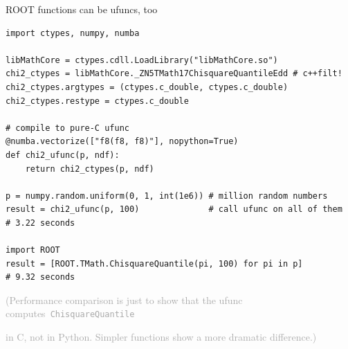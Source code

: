 \documentclass{beamer}
\begin{document}
\begin{frame}[fragile]{ROOT functions can be ufuncs, too}
\vspace{0.3 cm}
\scriptsize
\begin{verbatim}
import ctypes, numpy, numba

libMathCore = ctypes.cdll.LoadLibrary("libMathCore.so")
chi2_ctypes = libMathCore._ZN5TMath17ChisquareQuantileEdd # c++filt!
chi2_ctypes.argtypes = (ctypes.c_double, ctypes.c_double)
chi2_ctypes.restype = ctypes.c_double

# compile to pure-C ufunc
@numba.vectorize(["f8(f8, f8)"], nopython=True)
def chi2_ufunc(p, ndf):
    return chi2_ctypes(p, ndf)

p = numpy.random.uniform(0, 1, int(1e6)) # million random numbers
result = chi2_ufunc(p, 100)              # call ufunc on all of them
# 3.22 seconds

import ROOT
result = [ROOT.TMath.ChisquareQuantile(pi, 100) for pi in p]
# 9.32 seconds
\end{verbatim}

\vspace{0.5 cm}
\textcolor{darkgray}{(Performance comparison is just to show that the ufunc \mbox{computes {\tt ChisquareQuantile}\hspace{-1 cm}}}

\vspace{-0.1 cm}
\textcolor{darkgray}{in C, not in Python. Simpler functions show a more dramatic difference.)}
\end{frame}
\end{document}
